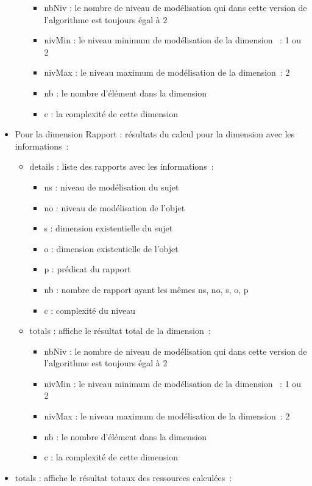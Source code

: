 \documentclass[
  letterpaper,
  DIV=11,
  numbers=noendperiod]{scrreprt}
\providecommand{\tightlist}{%
  \setlength{\itemsep}{0pt}\setlength{\parskip}{0pt}}\usepackage{longtable,booktabs,array}
\begin{document}
\begin{itemize}
\begin{itemize}
    \begin{itemize}
    \tightlist
    \item
      nbNiv : le nombre de niveau de modélisation qui dans cette version
      de l'algorithme est toujours égal à 2
    \item
      nivMin : le niveau minimum de modélisation de la dimension ~: 1 ou
      2
    \item
      nivMax : le niveau maximum de modélisation de la dimension~: 2
    \item
      nb : le nombre d'élément dans la dimension
    \item
      c : la complexité de cette dimension
    \end{itemize}
  \end{itemize}
\item
  Pour la dimension Rapport : résultats du calcul pour la dimension avec
  les informations~:

  \begin{itemize}
  \item
    details : liste des rapports avec les informations~:

    \begin{itemize}
    \tightlist
    \item
      ns : niveau de modélisation du sujet
    \item
      no : niveau de modélisation de l'objet
    \item
      s : dimension existentielle du sujet
    \item
      o : dimension existentielle de l'objet
    \item
      p : prédicat du rapport
    \item
      nb : nombre de rapport ayant les mêmes ns, no, s, o, p
    \item
      c : complexité du niveau
    \end{itemize}
  \item
    totals : affiche le résultat total de la dimension~:

    \begin{itemize}
    \tightlist
    \item
      nbNiv : le nombre de niveau de modélisation qui dans cette version
      de l'algorithme est toujours égal à 2
    \item
      nivMin : le niveau minimum de modélisation de la dimension ~: 1 ou
      2
    \item
      nivMax : le niveau maximum de modélisation de la dimension~: 2
    \item
      nb : le nombre d'élément dans la dimension
    \item
      c : la complexité de cette dimension
    \end{itemize}
  \end{itemize}
\item
  totals : affiche le résultat totaux des ressources calculées~:


\end{itemize}
\end{document}
